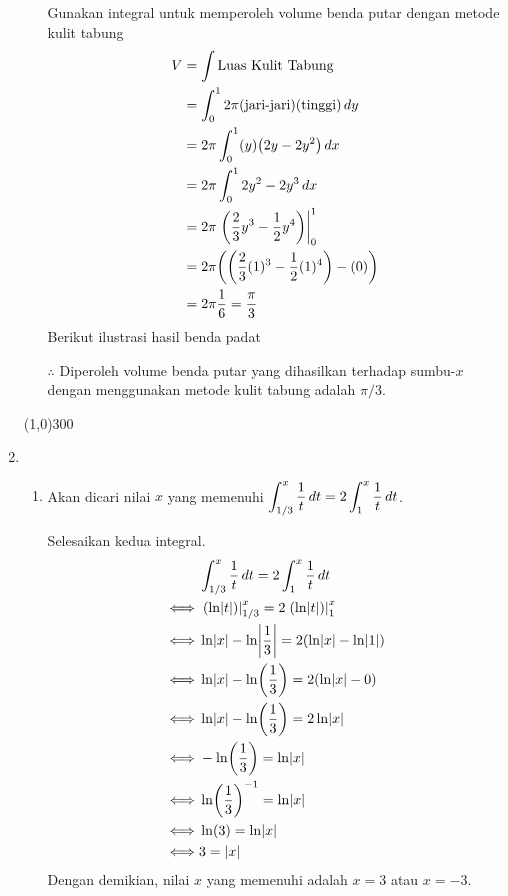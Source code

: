 \begin{enumerate}[leftmargin=*, label={\arabic*}.]
\begin{enumerate}[label={\alph*}.]
    Gunakan integral untuk memperoleh volume benda putar dengan metode kulit tabung
    \begin{align*}
        V &= \int \text{Luas Kulit Tabung}\\
        &=\int_{0}^{1} 2\pi(\text{jari-jari})(\text{tinggi})\,dy\\
        &=2\pi\int_{0}^{1} (y)\brk*{2y-2y^{2}}\,dx\\
        &=2\pi\int_{0}^{1} 2y^{2}-2y^{3}\,dx\\
        &=2\pi \eval{\frac{2}{3}y^{3}-\frac{1}{2}y^{4}}{0}{1}\\
        &=2\pi \brk*{\brk*{\frac{2}{3}(1)^{3}-\frac{1}{2}(1)^{4}}-(0)}\\
        &=2\pi\frac{1}{6} = \frac{\pi}{3}
    \end{align*}
    Berikut ilustrasi hasil benda padat

    

    $\therefore$ Diperoleh volume benda putar yang dihasilkan terhadap sumbu-$x$ 
    dengan menggunakan metode kulit tabung adalah $\pi/3$.

    \end{enumerate}

\begin{center}\line(1,0){300}\end{center}


\item 
    \begin{enumerate}[label={\alph*}.]
    \item Akan dicari nilai $x$ yang memenuhi 
    $\displaystyle\int_{1/3}^{x}\frac{1}{t}\,dt=2\int_{1}^{x}\frac{1}{t}\,dt$.

    Selesaikan kedua integral.
    \begin{align*}
        &\int_{1/3}^{x}\frac{1}{t}\,dt=2\int_{1}^{x}\frac{1}{t}\,dt\\
        \iff &\eval{\ln\abs{t}}{1/3}{x}=2\eval{\ln\abs{t}}{1}{x}\\
        \iff &\ln\abs{x}-\ln\abs*{\frac{1}{3}}=2\brk*{\ln\abs{x}-\ln\abs{1}}\\
        \iff &\ln\abs{x}-\ln\brk*{\frac{1}{3}}=2\brk*{\ln\abs{x}-0}\\
        \iff &\ln\abs{x}-\ln\brk*{\frac{1}{3}}=2\ln\abs{x}\\
        \iff &-\ln\brk*{\frac{1}{3}}=\ln\abs{x}\\
        \iff &\ln\brk*{\frac{1}{3}}^{-1}=\ln\abs{x}\\
        \iff &\ln(3)=\ln\abs{x}\\
        \iff &3=\abs{x}\\
    \end{align*}
    Dengan demikian, nilai $x$ yang memenuhi adalah $x=3$ atau $x=-3$.


\end{enumerate}
\end{enumerate}
